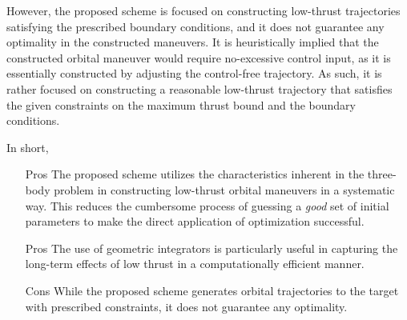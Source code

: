 \documentclass[11pt]{article}
\begin{document}
However, the proposed scheme is focused on constructing low-thrust trajectories satisfying the prescribed boundary conditions, and it does not guarantee any optimality in the constructed maneuvers. 
It is heuristically implied that the constructed orbital maneuver would require no-excessive control input, as it is essentially constructed by adjusting the control-free trajectory. 
As such, it is rather focused on constructing a reasonable low-thrust trajectory that satisfies the given constraints on the maximum thrust bound and the boundary conditions. 

In short,
\begin{itemize}
	\item[Pros] The proposed scheme utilizes the characteristics inherent in the three-body problem in constructing low-thrust orbital maneuvers in a systematic way. 
		This reduces the cumbersome process of guessing a \textit{good} set of initial parameters to make the direct application of optimization successful. 
	\item[Pros] The use of geometric integrators is particularly useful in capturing the long-term effects of low thrust in a computationally efficient manner. 
	\item[Cons] While the proposed scheme generates orbital trajectories to the target with prescribed constraints, it does not guarantee any optimality. 
\end{itemize}
\end{document}
